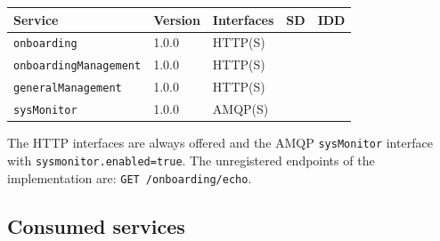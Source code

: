 \documentclass[a4paper]{arrowhead}
\begin{document}
\noindent\begin{longtable}{| p{5.3cm} | p{1.3cm} | p{2.6cm} | p{1.6cm} | p{3.6cm} |} \hline
\rowcolor{gray!33} Service & Version & Interfaces & SD & IDD \\ \hline \endhead
\texttt{onboarding} & 1.0.0 & HTTP(S) & \cite{onb-onboarding-sd} & \cite{onb-onboarding-http-idd} \\ \hline
\texttt{onboarding\allowbreak{}Management} & 1.0.0 & HTTP(S) & \cite{onb-onboardingManagement-sd} & \cite{onb-onboardingManagement-http-idd} \\ \hline
\texttt{generalManagement} & 1.0.0 & HTTP(S) & \cite{onb-generalManagement-sd} & \cite{onb-generalManagement-http-idd} \\ \hline
\texttt{sysMonitor} & 1.0.0 & AMQP(S) & \cite{onb-sysMonitor-sd} & \cite{onb-sysMonitor-amqp-idd} \\ \hline
\end{longtable}

The HTTP interfaces are always offered and the AMQP \texttt{sysMonitor} interface with \texttt{sysmonitor.enabled=true}. The unregistered endpoints of the implementation are: \texttt{GET /\allowbreak{}onboarding/\allowbreak{}echo}.

\subsection{Consumed services}
\end{document}
